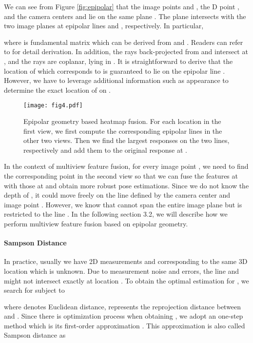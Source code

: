 {
We can see from Figure \ref{fig:epipolar} that the image points  and , the D point , and the camera centers  and  lie on the same plane . The plane intersects with the two image planes at epipolar lines  and , respectively. In particular, }

{
where  is fundamental matrix which can be derived from  and . Readers can refer to \citep{hartley2003multiple} for detail derivation.}
In addition, the rays back-projected from  and  intersect at , and the rays are coplanar, lying in . It is straightforward to derive that the location of  which corresponds to  is guaranteed to lie on the epipolar line . However, we have to leverage additional information such as appearance to determine the exact location of  on .


\begin{figure}
    \centering
    \texttt{[image: fig4.pdf]}
    \caption{Epipolar geometry based heatmap fusion. For each location  in the first view, we first compute the corresponding epipolar lines in the other two views. Then we find the largest responses on the two lines, respectively and add them to the original response at .}
    \label{fig:heatmap}
\end{figure}

In the context of multiview feature fusion, for every image point , we need to find the corresponding point  in the second view so that we can fuse the features at  with those at  and obtain more robust pose estimations. Since we do not know the depth of , it could move freely on the line defined by the camera center  and image point .  However, we know that  cannot span the entire image plane but is restricted to the line . In the following section 3.2, we will describe how we perform multiview feature fusion based on epipolar geometry.



{
\paragraph{Sampson Distance} 
In practice, usually we have 2D measurements  and  corresponding to the same 3D location  which is unknown. Due to measurement noise and errors, the line  and  might not intersect exactly at location . 
To obtain the optimal estimation for , we search for  subject to }

{where
 denotes Euclidean distance,  represents the reprojection distance \label{eq:reproj_error} between  and .} 
{Since there is optimization process when obtaining , we adopt an one-step method which is its first-order approximation \citep{hartley2003multiple}. This approximation is also called Sampson distance as}

